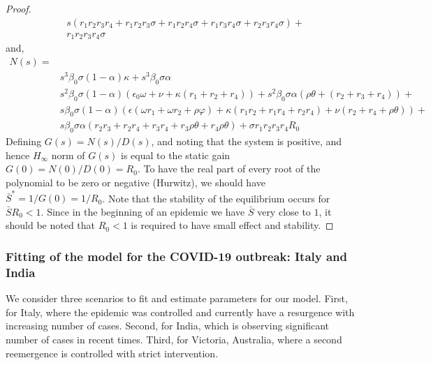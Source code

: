 \documentclass[authoryear,preprint]{elsarticle}
\begin{document}
\begin{proof}
\begin{equation}
\begin{split}
& s \left(r_{1} r_{2} r_{3} r_{4} + r_{1} r_{2} r_{3} \sigma + r_{1} r_{2} r_{4} \sigma + r_{1} r_{3} r_{4} \sigma + r_{2} r_{3} r_{4} \sigma\right) +\\ 
& r_{1} r_{2} r_{3} r_{4} \sigma 
\end{split}
\end{equation}
%
and,
\begin{equation}
\begin{split}
N(s) = \\
& s^{3} \beta_0 \sigma \left( 1-  \alpha\right) \kappa + s^{3} \beta_0 \sigma \alpha \\
& s^{2} \beta_0 \sigma \left( 1-\alpha\right)\left( \epsilon_0 \omega + \nu + \kappa \left( r_1+r_2+r_4\right) \right) + s^{2} \beta_0 \sigma \alpha \left( \rho \theta + \left( r_2+r_3+r_4\right) \right) + \\
& s \beta_0 \sigma (1-\alpha) (\epsilon ( \omega r_1+  \omega r_2 + \rho \varphi ) + \kappa (r_1r_2+r_1r_4+r_2r_4) + \nu (r_2+r_4+\rho \theta)) + \\
& s \beta_0 \sigma \alpha (r_2r_3+r_2r_4+r_3r_4+r_3 \rho \theta + r_4 \rho \theta) + \sigma r_1 r_2 r_3 r_4 R_0
\end{split}
\end{equation}
%
%
Defining $G(s) = N(s)/D(s)$, and noting that the system is positive, and hence $H_{\infty}$ norm of $G(s)$ is equal to the static gain $G(0) = N(0)/D(0) = R_0$. To have the real part of every root of the polynomial to be zero or negative (Hurwitz), we should have $\bar{S}^* = {1}/{G(0)} = {1}/{R_0}$. Note that the stability of the equilibrium occurs for $\bar{S}R_0 < 1$. Since in the beginning of an epidemic we have $\bar{S}$ very close to $1$, it should be noted that $R_0 < 1$ is required to have  small effect and stability.
\end{proof}
%
%
\subsubsection{Fitting of the model for the COVID-19 outbreak: Italy and India}
We consider three scenarios to fit and estimate parameters for our model. First, for Italy, where the epidemic was controlled and currently have a resurgence with increasing number of cases. Second, for India, which is observing significant number of cases in recent times. Third, for Victoria, Australia, where a second reemergence is controlled with strict intervention.
\end{document}
